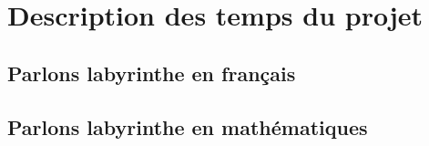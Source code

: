 
\section{Description des temps du projet}
\subsection{Parlons labyrinthe en français}


\subsection{Parlons labyrinthe en mathématiques}

